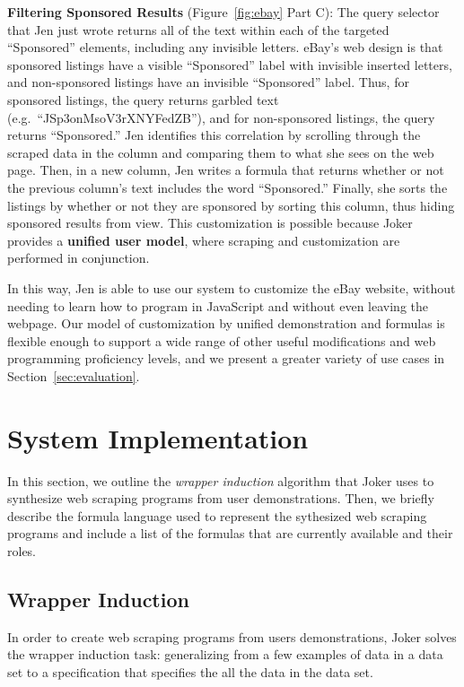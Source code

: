 \documentclass[sigconf,10pt]{acmart}
\begin{document}
\textbf{Filtering Sponsored Results} (Figure~\ref{fig:ebay} Part C): The
query selector that Jen just wrote returns all of the text within each
of the targeted ``Sponsored'' elements, including any invisible letters.
eBay's web design is that sponsored listings have a visible
``Sponsored'' label with invisible inserted letters, and non-sponsored
listings have an invisible ``Sponsored'' label. Thus, for sponsored
listings, the query returns garbled text
(e.g.~``JSp3onMsoV3rXNYFedZB''), and for non-sponsored listings, the
query returns ``Sponsored.'' Jen identifies this correlation by
scrolling through the scraped data in the column and comparing them to
what she sees on the web page. Then, in a new column, Jen writes a
formula that returns whether or not the previous column's text includes
the word ``Sponsored.'' Finally, she sorts the listings by whether or
not they are sponsored by sorting this column, thus hiding sponsored
results from view. This customization is possible because Joker provides
a \textbf{unified user model}, where scraping and customization are
performed in conjunction.

In this way, Jen is able to use our system to customize the eBay
website, without needing to learn how to program in JavaScript and
without even leaving the webpage. Our model of customization by unified
demonstration and formulas is flexible enough to support a wide range of
other useful modifications and web programming proficiency levels, and
we present a greater variety of use cases in
Section~\ref{sec:evaluation}.

\hypertarget{sec:implementation}{%
\section{System Implementation}\label{sec:implementation}}

In this section, we outline the \emph{wrapper induction}
\citep{kushmerick2000} algorithm that Joker uses to synthesize web
scraping programs from user demonstrations. Then, we briefly describe
the formula language used to represent the sythesized web scraping
programs and include a list of the formulas that are currently available
and their roles.

\hypertarget{wrapper-induction}{%
\subsection{Wrapper Induction}\label{wrapper-induction}}

In order to create web scraping programs from users demonstrations,
Joker solves the wrapper induction \citep{kushmerick2000} task:
generalizing from a few examples of data in a data set to a
specification that specifies the all the data in the data set.
\end{document}

